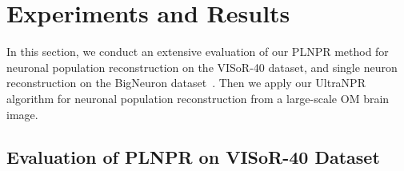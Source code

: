 \section{Experiments and Results}
\label{sec:experiments}

In this section, we conduct an extensive evaluation of our PLNPR method for neuronal population reconstruction on the VISoR-40 dataset, and single neuron reconstruction on the BigNeuron dataset~\cite{peng2015}. 
Then we apply our UltraNPR algorithm for neuronal population reconstruction from a large-scale OM brain image.

\subsection{Evaluation of PLNPR on VISoR-40 Dataset}
\label{sec:exp_PLNPR_VISoR}

